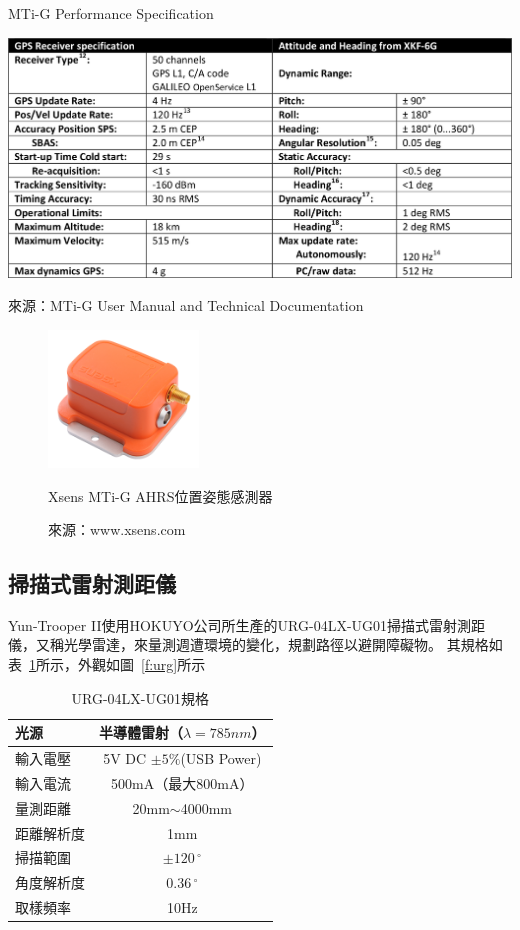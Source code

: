 \begin{table}[h!]
	\centering
	\caption{MTi-G Performance Specification}
	\label{t:mti-g_performance}
	\includegraphics[width=\textwidth]{tables/MTi-G_Performance}
	\caption*{來源：MTi-G User Manual and Technical Documentation\cite{Xsens:2012:MTiG_Manual}}
\end{table}

\begin{figure}[h!]
	\centering
	\includegraphics[width=4cm]{figures/hardware/MTi-G}
	\caption{Xsens MTi-G AHRS位置姿態感測器}
	\caption*{來源：www.xsens.com}
	\label{f:MTi-G}
\end{figure}

\subsection{掃描式雷射測距儀}
Yun-Trooper II使用HOKUYO公司所生產的URG-04LX-UG01掃描式雷射測距儀，又稱光學雷達，來量測週遭環境的變化，規劃路徑以避開障礙物。
其規格如表~\ref{t:urg-specs}所示，外觀如圖~\ref{f:urg}所示

\begin{table}[h!]
	\centering
	\caption{URG-04LX-UG01規格}
	\label{t:urg-specs}
	\begin{tabular}{| l | c |}
		\hline
		光源 & 半導體雷射（$\lambda = 785nm$） \\ \hline
		輸入電壓 & 5V DC $\pm 5\%$(USB Power) \\ \hline
		輸入電流 & 500mA（最大800mA） \\ \hline
		量測距離 & 20mm$\sim$4000mm \\ \hline
		距離解析度 & 1mm \\ \hline
		掃描範圍 & $\pm 120\,^{\circ}$ \\ \hline
		角度解析度 & $0.36\,^{\circ}$ \\ \hline
		取樣頻率 & 10Hz \\
		\hline
	\end{tabular}
\end{table}

